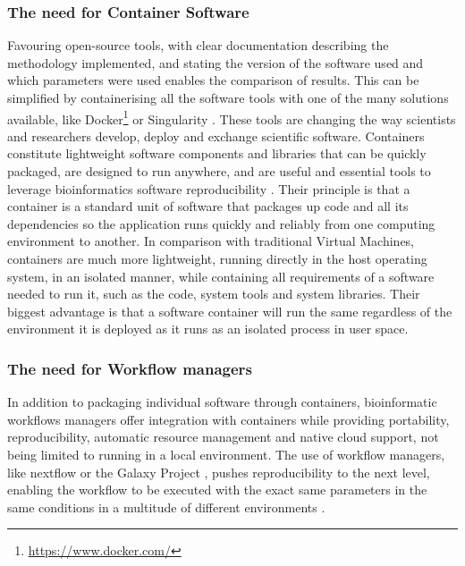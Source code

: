 \subsubsection{The need for Container Software} 

Favouring open-source tools, with clear documentation describing the methodology implemented, and stating the version of the software used and which parameters were used enables the comparison of results. This can be simplified by containerising all the software tools with one of the many solutions available, like Docker\footnote{\url{https://www.docker.com/}} or Singularity \citep{kurtzer_singularity_2017}. These tools are changing the way scientists and researchers develop, deploy and exchange scientific software. Containers constitute lightweight software components and
libraries that can be quickly packaged, are designed to run anywhere, and are useful and essential tools to leverage bioinformatics software reproducibility \citep{boettiger_introduction_2015,gruening_recommendations_2019}. Their principle is that a container is a standard unit of software that packages up code and all its dependencies so the application runs quickly and reliably from one computing environment to another. In comparison with traditional Virtual Machines, containers are much more lightweight, running directly in the host operating system, in an isolated manner, while containing all requirements of a software needed to run it, such as the code, system tools and system libraries. Their biggest advantage is that a software container will run the same regardless of the environment it is deployed as it runs as an isolated process in user space. 

\subsubsection{The need for Workflow managers}

In addition to packaging individual software through containers, bioinformatic workflows managers offer integration with containers while providing portability, reproducibility, automatic resource management and native cloud support, not being limited to running in a local environment. 
The use of workflow managers, like nextflow \citep{di_tommaso_nextflow_2017} or the Galaxy Project \citep{afgan_galaxy_2018}, pushes reproducibility to the next level, enabling the workflow to be executed with the exact same parameters in the same conditions in a multitude of different environments \citep{wratten_reproducible_2021}. 

